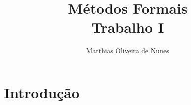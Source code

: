 \documentclass[12pt]{article}
\title{Métodos Formais\\ Trabalho I}
\author{Matthias Oliveira de Nunes}
\begin{document}
\maketitle

\begin{abstract}



\end{abstract}

\section{Introdução}
\end{document}
